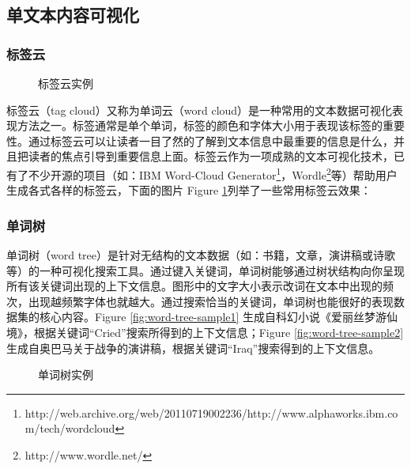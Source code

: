 \subsection{单文本内容可视化}
\subsubsection{标签云}
\begin{figure}[htb]
	\centering
	\caption{标签云实例}
	\label{fig:tag-cloud}
\end{figure}
标签云（tag cloud）又称为单词云（word cloud）是一种常用的文本数据可视化表现方法之一。标签通常是单个单词，标签的颜色和字体大小用于表现该标签的重要性。通过标签云可以让读者一目了然的了解到文本信息中最重要的信息是什么，并且把读者的焦点引导到重要信息上面。标签云作为一项成熟的文本可视化技术，已有了不少开源的项目（如：IBM Word-Cloud Generator\footnote{http://web.archive.org/web/20110719002236/http://www.alphaworks.ibm.com/tech/wordcloud}，Wordle\footnote{http://www.wordle.net/}等）帮助用户生成各式各样的标签云，下面的图片 Figure \ref{fig:tag-cloud}列举了一些常用标签云效果：

\subsubsection{单词树}
单词树（word tree）\cite{Wattenberg2008}是针对无结构的文本数据（如：书籍，文章，演讲稿或诗歌等）的一种可视化搜索工具。通过键入关键词，单词树能够通过树状结构向你呈现所有该关键词出现的上下文信息。图形中的文字大小表示改词在文本中出现的频次，出现越频繁字体也就越大。通过搜索恰当的关键词，单词树也能很好的表现数据集的核心内容。Figure \ref{fig:word-tree-sample1} 生成自科幻小说《爱丽丝梦游仙境》，根据关键词“Cried”搜索所得到的上下文信息；Figure \ref{fig:word-tree-sample2} 生成自奥巴马关于战争的演讲稿，根据关键词“Iraq”搜索得到的上下文信息。 
\begin{figure}[htb]
	\centering
		\caption{单词树实例}
	\label{fig:word-tree}
\end{figure}

